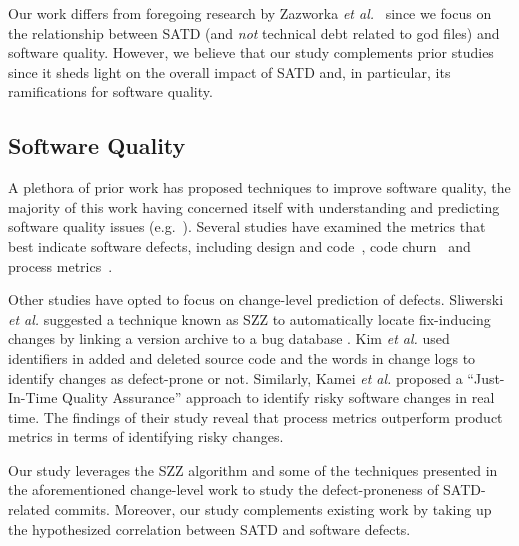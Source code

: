 Our work differs from foregoing research by Zazworka {\em et al.}~\cite{zazworka2011investigating,Zazworka:2013} since we focus on the relationship between SATD (and \textit{not} technical debt related to god files) and software quality. However, we believe that our study complements prior studies since it sheds light on the overall impact of SATD and, in particular, its ramifications for software quality.

\subsection{Software Quality}

A plethora of prior work has proposed techniques to improve software quality, the majority of this work having concerned itself with understanding and predicting software quality issues (e.g.~\cite{Zimmerman2008Springer}). Several studies have examined the metrics that best indicate software defects, including design and code~\cite{Jiang-promise-2008}, code churn~\cite{Nagappan-icse-2005} and process metrics~\cite{Moser-icse-2008,Rahman-icse-2013}.


Other studies have opted to focus on change-level prediction of defects. Sliwerski  \emph{et al.} suggested a technique known as SZZ to automatically locate fix-inducing changes by linking a version archive to a bug database \cite{Sliwerski-fse-2005}.   Kim \emph{et al.} \cite{Kim-tse-2008} used identifiers in added and deleted source code and the words in change logs to identify changes as defect-prone or not. Similarly,  Kamei \cite{Kamei-tse-2013} \textit{et al.} proposed a  ``Just-In-Time Quality Assurance''  approach to identify risky software changes in real time.  The findings of their study reveal that process metrics outperform product metrics in terms of identifying risky changes.

Our study leverages the SZZ algorithm and some of the techniques presented in the aforementioned change-level work to study the defect-proneness of SATD-related commits. Moreover, our study complements existing work by taking up the hypothesized correlation between SATD and software defects.

